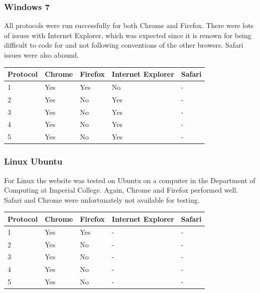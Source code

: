 \documentclass[a4paper,11pt,titlepage]{article}
\begin{document}
\subsubsection*{Windows 7}

All protocols were run successfully for both Chrome and Firefox. There were lots of issues with Internet Explorer, which was expected since it is renown for being difficult to code for and not following conventions of the other browers. Safari issues were also abound.

\begin{center}

  \begin{tabular}{ | l || l | l | l | l |}
    \hline
    Protocol & Chrome & Firefox & Internet Explorer & Safari \\ \hline \hline
    1 & Yes & Yes  & No  & - \\ \hline
    2 & Yes & No & Yes & - \\ \hline
    3 & Yes & No & Yes & - \\ \hline
    4 & Yes & No & Yes & - \\ \hline
    5 & Yes & No & Yes & - \\
    \hline
  \end{tabular}

\end{center}

\subsubsection*{Linux Ubuntu}

For Linux the website was tested on Ubuntu on a computer in the Department of Computing at Imperial College. Again, Chrome and Firefox performed well. Safari and Chrome were unfortunately not available for testing.

\begin{center}

  \begin{tabular}{ | l || l | l | l | l |}
    \hline
    Protocol & Chrome & Firefox & Internet Explorer & Safari \\ \hline \hline
    1 & Yes & Yes  & -  & - \\ \hline
    2 & Yes & No & - & - \\ \hline
    3 & Yes & No & - & - \\ \hline
    4 & Yes & No & - & - \\ \hline
    5 & Yes & No & - & - \\
    \hline
  \end{tabular}

\end{center}
\end{document}
